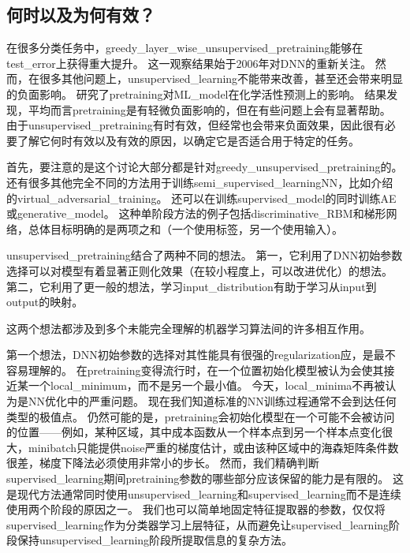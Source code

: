 \subsection{何时以及为何有效？}
\label{sec:when_and_why_does_unsupervised_pretraining_work}
在很多分类任务中，\gls{greedy_layer_wise_unsupervised_pretraining}能够在\gls{test_error}上获得重大提升。
这一观察结果始于2006年对\gls{DNN}的重新关注\citep{Hinton06-small,Bengio-nips-2006,ranzato-07-small}。
然而，在很多其他问题上，\gls{unsupervised_learning}不能带来改善，甚至还会带来明显的负面影响。
\cite{Ma-et-al-2015}研究了\gls{pretraining}对\gls{ML_model}在化学活性预测上的影响。
结果发现，平均而言\gls{pretraining}是有轻微负面影响的，但在有些问题上会有显著帮助。
由于\gls{unsupervised_pretraining}有时有效，但经常也会带来负面效果，因此很有必要了解它何时有效以及有效的原因，以确定它是否适合用于特定的任务。


首先，要注意的是这个讨论大部分都是针对\gls{greedy_unsupervised_pretraining}的。
还有很多其他完全不同的方法用于训练\gls{semi_supervised_learning}\gls{NN}，比如介绍的\gls{virtual_adversarial_training}。
还可以在训练\gls{supervised_model}的同时训练\gls{AE}或\gls{generative_model}。
这种单阶段方法的例子包括\gls{discriminative_RBM}\citep{Larochelle+Bengio-2008}和梯形网络\citep{Rasmus-et-al-arxiv2015}，总体目标明确的是两项之和（一个使用标签，另一个使用输入）。


\gls{unsupervised_pretraining}结合了两种不同的想法。
第一，它利用了\gls{DNN}初始参数选择可以对模型有着显著正则化效果（在较小程度上，可以改进优化）的想法。
第二，它利用了更一般的想法，学习\gls{input_distribution}有助于学习从\gls{input}到\gls{output}的映射。


这两个想法都涉及到多个未能完全理解的机器学习算法间的许多相互作用。


第一个想法，\gls{DNN}初始参数的选择对其性能具有很强的\gls{regularization}应，是最不容易理解的。
在\gls{pretraining}变得流行时，在一个位置初始化模型被认为会使其接近某一个\gls{local_minimum}，而不是另一个最小值。
今天，\gls{local_minima}不再被认为是\gls{NN}优化中的严重问题。
现在我们知道标准的\gls{NN}训练过程通常不会到达任何类型的极值点。
仍然可能的是，\gls{pretraining}会初始化模型在一个可能不会被访问的位置——例如，某种区域，其中成本函数从一个样本点到另一个样本点变化很大，\gls{minibatch}只能提供\gls{noise}严重的梯度估计，或由该种区域中的海森矩阵条件数很差，梯度下降法必须使用非常小的步长。
然而，我们精确判断\gls{supervised_learning}期间\gls{pretraining}参数的哪些部分应该保留的能力是有限的。
这是现代方法通常同时使用\gls{unsupervised_learning}和\gls{supervised_learning}而不是连续使用两个阶段的原因之一。
我们也可以简单地固定特征提取器的参数，仅仅将\gls{supervised_learning}作为分类器学习上层特征，从而避免让\gls{supervised_learning}阶段保持\gls{unsupervised_learning}阶段所提取信息的复杂方法。


